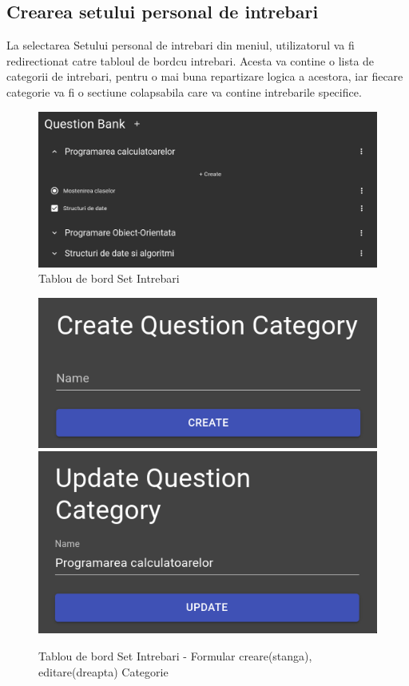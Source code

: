 \documentclass[12pt, a4paper, oneside, romanian]{teza-upb}
\begin{document}
\subsection{Crearea setului personal de intrebari}

La selectarea Setului personal de intrebari din meniul, utilizatorul va fi redirectionat catre tabloul de bordcu intrebari. Acesta va contine o lista de categorii de intrebari, pentru o mai buna repartizare logica a acestora, iar fiecare categorie va fi o sectiune colapsabila care va contine intrebarile specifice.

\begin{figure}[H]
\centering
\includegraphics*[width=\columnwidth]{tablou-de-bord-set-intrebari}
\caption{Tablou de bord Set Intrebari}
\label{tablou-de-bord-set-intrebari}
\end{figure}

\begin{figure}[H]
\centering
\includegraphics*[width=0.45\columnwidth]{tablou-de-bord-set-intrebari-creare-categorie}
\includegraphics*[width=0.45\columnwidth]{tablou-de-bord-set-intrebari-editare-categorie}
\caption{Tablou de bord Set Intrebari - Formular creare(stanga), editare(dreapta) Categorie}
\label{tablou-de-bord-set-intrebari-categorie}
\end{figure}
\end{document}

